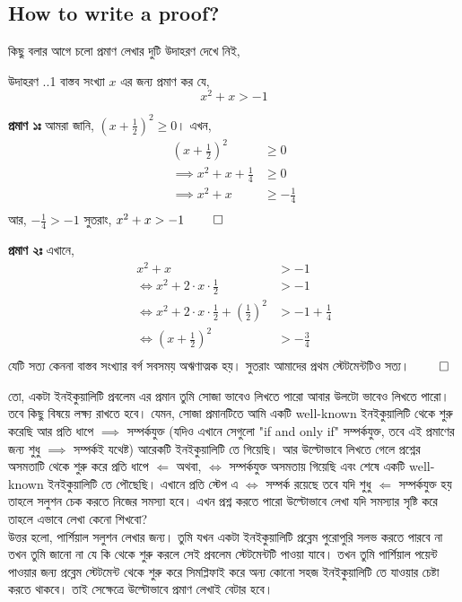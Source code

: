 \documentclass[12pt]{article}
\begin{document}
\subsection{How to write a proof?}
কিছু বলার আগে চলো প্রমাণ লেখার দুটি উদাহরণ দেখে নিই,
\begin{exam} {উদাহরণ \thesection.\thesubsection.1}
    বাস্তব সংখ্যা $x$ এর জন্য প্রমাণ কর যে,
    $$x^2 + x > -1$$
\end{exam}
\begin{sol}
    \textbf{প্রমাণ ১ঃ} আমরা জানি, $\left(x+\frac 12\right)^2 \geq 0$। এখন,
    \begin{align*}
        \left(x+\frac 12\right)^2 &\geq 0\\
        \implies x^2 + x + \frac 14 &\geq 0\\
        \implies x^2 + x &\geq - \frac 14\\
    \end{align*}
    আর, $-\frac{1}{4} > -1$ সুতরাং, $x^2 + x > -1 \ \qed$ 
\end{sol}
\begin{sol}
    \textbf{প্রমাণ ২ঃ} এখানে, 
    \begin{align*}
        x^2 + x &> -1\\
        \iff x^2 + 2\cdot x\cdot \frac 12 &> -1\\
        \iff x^2 + 2\cdot x\cdot \frac 12 + \left(\frac 12\right)^2 &> -1 + \frac 14\\
        \iff \left(x+\frac 12\right)^2 &> -\frac{3}{4}\\
    \end{align*}
    যেটি সত্য কেননা বাস্তব সংখ্যার বর্গ সবসময় অঋণাত্মক হয়। সুতরাং আমাদের প্রথম স্টেটমেন্টটিও সত্য। $\qed$
\end{sol}
তো, একটা ইনইকুয়ালিটি প্রবলেম এর প্রমান তুমি সোজা ভাবেও লিখতে পারো আবার উলটো ভাবেও লিখতে পারো।
তবে কিছু বিষয়ে লক্ষ্য রাখতে হবে। যেমন, সোজা প্রমানটিতে আমি একটি well-known ইনইকুয়ালিটি থেকে শুরু 
করেছি আর প্রতি ধাপে $\implies$ সম্পর্কযুক্ত (যদিও এখানে সেগুলো "if and only if" সম্পর্কযুক্ত, তবে এই 
প্রমাণের জন্য শুধু $\implies$ সম্পর্কই যথেষ্ট) আরেকটি ইনইকুয়ালিটি তে গিয়েছি। আর উল্টোভাবে লিখতে গেলে 
প্রশ্নের অসমতাটি থেকে শুরু করে প্রতি ধাপে $\Longleftarrow$ অথবা, $\iff$ সম্পর্কযুক্ত 
অসমতায় গিয়েছি এবং শেষে একটি well-known ইনইকুয়ালিটি তে পৌছেছি। এখানে প্রতি স্টেপ এ $\iff$ সম্পর্ক 
রয়েছে তবে যদি শুধু $\Longleftarrow$ সম্পর্কযুক্ত 
হয় তাহলে সলুশন চেক করতে নিজের সমস্যা হবে।  
এখন প্রশ্ন করতে পারো উল্টোভাবে লেখা যদি সমস্যার সৃষ্টি 
করে তাহলে এভাবে লেখা কেনো শিখবো?\\
উত্তর হলো, পার্শিয়াল সলুশন লেখার জন্য। তুমি যখন একটা ইনইকুয়ালিটি প্রব্লেম পুরোপুরি সলভ করতে পারবে না তখন 
তুমি জানো না যে কি থেকে শুরু করলে সেই প্রবলেম স্টেটমেন্টটি পাওয়া যাবে। তখন তুমি পার্শিয়াল পয়েন্ট পাওয়ার জন্য 
প্রব্লেম স্টেটমেন্ট থেকে শুরু করে সিমপ্লিফাই করে অন্য কোনো সহজ ইনইকুয়ালিটি তে যাওয়ার চেষ্টা করতে থাকবে।
তাই সেক্ষেত্রে উল্টোভাবে প্রমাণ লেখাই বেটার হবে।
\end{document}
